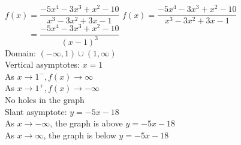 {$f(x) = \dfrac{-5x^{4} - 3x^{3} + x^{2} - 10}{x^{3} - 3x^{2} + 3x - 1}$}
{$f(x) = \dfrac{-5x^{4} - 3x^{3} + x^{2} - 10}{x^{3} - 3x^{2} + 3x - 1}$ \\ $\phantom{f(x)} = \dfrac{-5x^{4} - 3x^{3} + x^{2} - 10}{(x-1)^3} $ \\
Domain: $(-\infty, 1) \cup (1, \infty)$\\
Vertical asymptotes: $x = 1$\\
As $x \rightarrow 1^{-}, f(x) \rightarrow \infty$\\
As $x \rightarrow 1^{+}, f(x) \rightarrow -\infty$\\
No holes in the graph \\
Slant asymptote: $y=-5x-18$ \\
 As $x \rightarrow -\infty$, the graph is above $y=-5x-18$ \\
As $x \rightarrow \infty$, the graph is below $y=-5x-18$}